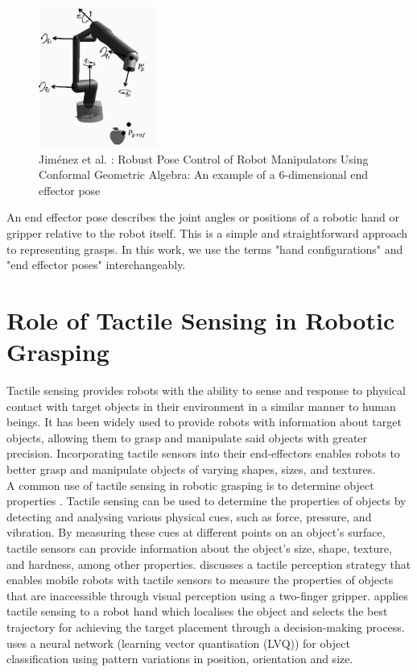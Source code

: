 \documentclass[11pt, a4paper]{report}
\begin{document}
\begin{figure}[H]
    \centering
    \includegraphics[width=0.35\textwidth]{docs/Project Report/Media/2_1_2_ee_pose_eg.png}
    \caption{Jiménez et al. \cite{jimenez2014}: Robust Pose Control of Robot Manipulators Using Conformal Geometric Algebra: An example of a 6-dimensional end effector pose}
    \label{fig:2.4}
\end{figure}

An end effector pose describes the joint angles or positions of a robotic hand or gripper relative to the robot itself. This is a simple and straightforward approach to representing grasps. In this work, we use the terms "hand configurations" and "end effector poses" interchangeably.



\section{Role of Tactile Sensing in Robotic Grasping}
\label{sec:2.2}
Tactile sensing provides robots with the ability to sense and response to physical contact with target objects in their environment in a similar manner to human beings. It has been widely used to provide robots with information about target objects, allowing them to grasp and manipulate said objects with greater precision. Incorporating tactile sensors into their end-effectors enables robots to better grasp and manipulate objects of varying shapes, sizes, and textures.\\

A common use of tactile sensing in robotic grasping is to determine object properties \cite{chitta2010, hsiao2010, JIMENEZ1997488}. Tactile sensing can be used to determine the properties of objects by detecting and analysing various physical cues, such as force, pressure, and vibration. By measuring these cues at different points on an object's surface, tactile sensors can provide information about the object's size, shape, texture, and hardness, among other properties. \cite{chitta2010} discusses a tactile perception strategy that enables mobile robots with tactile sensors to measure the properties of objects that are inaccessible through visual perception using a two-finger gripper. \cite{hsiao2010} applies tactile sensing to a robot hand which localises the object and selects the best trajectory for achieving the target placement through a decision-making process. \cite{JIMENEZ1997488} uses a neural network (learning vector quantisation (LVQ)) for object classification using pattern variations in position, orientation and size.\\
\end{document}
